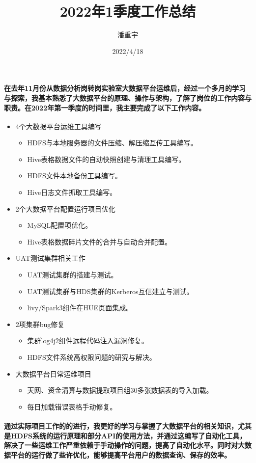 \documentclass{article}
\title{2022年1季度工作总结}
\author{潘重宇}
\date{2022/4/18}
\begin{document}
\maketitle
\paragraph{在去年11月份从数据分析岗转岗实验室大数据平台运维后，经过一个多月的学习与探索，我基本熟悉了大数据平台的原理、操作与架构，了解了岗位的工作内容与职责。在2022年第一季度的时间里，我主要完成了以下工作内容。}

\begin{itemize}
	\item 4个大数据平台运维工具编写
	\begin{itemize}
		\item HDFS与本地服务器的文件压缩、解压缩互传工具编写。
		\item Hive表格数据文件的自动快照创建与清理工具编写。
		\item HDFS文件本地备份工具编写。
		\item Hive日志文件抓取工具编写。
	\end{itemize}
	\item 2个大数据平台配置运行项目优化
	\begin{itemize}
		\item MySQL配置项优化。
		\item Hive表格数据碎片文件的合并与自动合并配置。
	\end{itemize}
	\item UAT测试集群相关工作
	\begin{itemize}
		\item UAT测试集群的搭建与测试。
		\item UAT测试集群与HDS集群的Kerberos互信建立与测试。
		\item livy/Spark3组件在HUE页面集成。
	\end{itemize}
	\item 2项集群bug修复
	\begin{itemize}
		\item 集群log4j2组件远程代码注入漏洞修复。
		\item HDFS文件系统高权限问题的研究与解决。
	\end{itemize}
	\item 大数据平台日常运维项目
	\begin{itemize}
		\item 天网、资金清算与数据提取项目组30多张数据表的导入加载。
		\item 每日加载错误表格手动修复。
	\end{itemize}
\end{itemize}

\paragraph{通过实际项目工作的的进行，我更好的学习与掌握了大数据平台的相关知识，尤其是HDFS系统的运行原理和部分API的使用方法，并通过这编写了自动化工具，解决了一些运维工作严重依赖于手动操作的问题，提高了自动化水平。同时对大数据平台的运行做了些许优化，能够提高平台用户的数据查询、保存的效率。}
\end{document}
